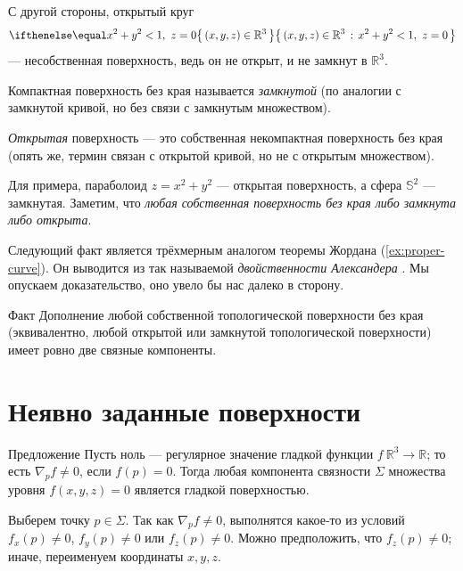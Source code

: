 С другой стороны, открытый круг 
\[\set{(x,y,z)\in\mathbb{R}^3}{x^2+y^2<1,\  z=0}\]
--- несобственная поверхность, ведь он не открыт, и не замкнут в $\mathbb{R}^3$.

{\sloppy

Компактная поверхность без края называется \emph{замкнутой}
(по аналогии с замкнутой кривой, но без связи с замкнутым множеством).

}

\emph{Открытая} поверхность --- это
собственная некомпактная поверхность без края 
(опять же, термин связан с открытой кривой, но не с открытым множеством).

Для примера, параболоид $z=x^2+y^2$ --- открытая поверхность,
а сфера $\mathbb{S}^2$ --- замкнутая.
Заметим, что \textit{любая собственная поверхность без края либо замкнута либо открыта}.

{\sloppy

Следующий факт является трёхмерным аналогом теоремы Жордана (\ref{ex:proper-curve}).
Он выводится из так называемой {}\emph{двойственности Александера} \cite{hatcher}.
Мы опускаем доказательство, оно увело бы нас далеко в сторону.

}

\begin{thm}{Факт}\label{clm:proper-divides}
Дополнение любой собственной топологической поверхности без края (эквивалентно, любой открытой или замкнутой топологической поверхности) имеет ровно две связные компоненты.
\end{thm}


\section{Неявно заданные поверхности}

\begin{thm}{Предложение}\label{prop:implicit-surface}
Пусть ноль --- регулярное значение гладкой функции $f\:\mathbb{R}^3\to \mathbb{R}$;
то есть $\nabla_p f\ne 0$, если $f(p)=0$.
Тогда любая компонента связности $\Sigma$ множества уровня $f(x,y,z)=0$ является гладкой поверхностью.
\end{thm}

Выберем точку $p\in\Sigma$.
Так как $\nabla_p f\ne 0$, выполнятся какое-то из условий 
$f_x(p)\ne 0$,
$f_y(p)\ne 0$ или
$f_z(p)\ne 0$.
Можно предположить, что $f_z(p)\ne 0$;
иначе, переименуем координаты $x,y,z$.

